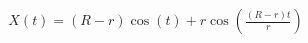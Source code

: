 \documentclass[preview]{standalone}
\begin{document}
\begin{align*}
X(t) = (R - r) \cos(t) + r \cos\left(\frac{(R - r)t}{r}\right)
\end{align*}
\end{document}
